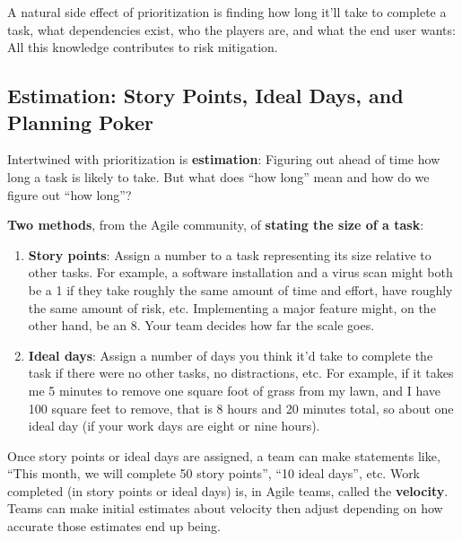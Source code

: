 A natural side effect of prioritization is finding how long it'll take to complete a task, what dependencies exist, who the players are, and what the end user wants: All this knowledge contributes to risk mitigation.

\subsection{Estimation: Story Points, Ideal Days, and Planning Poker}

\marginpar{\idealDaysDef\margindivider}\marginpar{\velocityDef\margindivider}\marginpar{\planningPokerDef\margindivider}\marginpar{\schedulingDef}
Intertwined with prioritization is \textbf{estimation}: Figuring out ahead of time how long a task is likely to take. But what does ``how long'' mean and how do we figure out ``how long''?

\textbf{Two methods}, from the Agile community, of \textbf{stating the size of a task}:

\begin{enumerate}
\item \textbf{Story points}: Assign a number to a task representing its size relative to other tasks. For example, a software installation and a virus scan might both be a 1 if they take roughly the same amount of time and effort, have roughly the same amount of risk, etc. Implementing a major feature might, on the other hand, be an 8. Your team decides how far the scale goes.
\item \textbf{Ideal days}: Assign a number of days you think it'd take to complete the task if there were no other tasks, no distractions, etc. For example, if it takes me 5 minutes to remove one square foot of grass from my lawn, and I have 100 square feet to remove, that is 8 hours and 20 minutes total, so about one ideal day (if your work days are eight or nine hours).
\end{enumerate}

Once story points or ideal days are assigned, a team can make statements like, ``This month, we will complete 50 story points'', ``10 ideal days'', etc. Work completed (in story points or ideal days) is, in Agile teams, called the \textbf{velocity}. Teams can make initial estimates about velocity then adjust depending on how accurate those estimates end up being.

